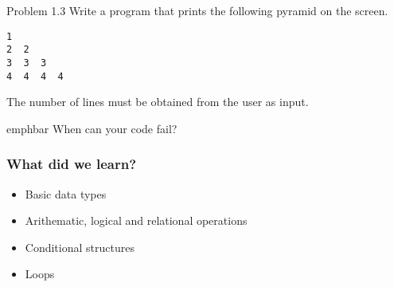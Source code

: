 \documentclass[14pt,compress]{beamer}
\newcommand{\emphbar}[1]
{\begin{beamercolorbox}[rounded=true]{emphbar} 
      {#1}
 \end{beamercolorbox}
}
\newcounter{time}
\newcommand{\inctime}[1]{\addtocounter{time}{#1}{\tiny \thetime\ m}}
\begin{document}
\begin{frame}[fragile]{Problem 1.3}
  Write a program that prints the following pyramid on the screen. 
  \begin{lstlisting}
1
2  2
3  3  3
4  4  4  4
  \end{lstlisting}
The number of lines must be obtained from the user as input.\\
\pause
\emphbar{When can your code fail?}
\only<2->{\inctime{10}}
\end{frame}

\begin{frame}[fragile]
  \frametitle{What did we learn?}
  \begin{itemize}
    \item Basic data types
    \item Arithematic, logical and relational operations
    \item Conditional structures
    \item Loops
  \end{itemize}
\end{frame}
\end{document}
